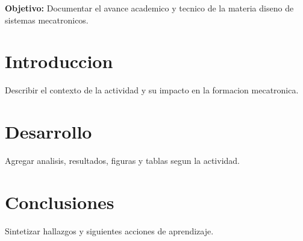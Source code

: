 \documentclass[spanish,letterpaper,oneside]{article}
\begin{document}
\templatePortrait
\templatePagecfg
\onehalfspacing

\begin{abstractd}
\textbf{Objetivo:} Documentar el avance academico y tecnico de la materia diseno de sistemas mecatronicos.
\end{abstractd}

\templateIndex
\templateFinalcfg

\section{Introduccion}
Describir el contexto de la actividad y su impacto en la formacion mecatronica.

\section{Desarrollo}
Agregar analisis, resultados, figuras y tablas segun la actividad.

\section{Conclusiones}
Sintetizar hallazgos y siguientes acciones de aprendizaje.



\end{document}
